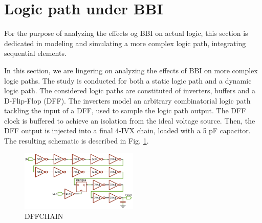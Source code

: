 
\section{Logic path under BBI}
For the purpose of analyzing the effects og BBI on actual logic, this section is dedicated in modeling and simulating a more complex logic path, integrating sequential elements.


In this section, we are lingering on analyzing the effects of BBI on more complex logic paths.
The study is conducted for both a static logic path and a dynamic logic path.
The considered logic paths are constituted of inverters, buffers and a D-Flip-Flop (DFF).
The inverters model an arbitrary combinatorial logic path tackling the input of a DFF, used to sample the logic path output.
The DFF clock is buffered to achieve an isolation from the ideal voltage source.
Then, the DFF output is injected into a final 4-IVX chain, loaded with a 5 pF capacitor.
The resulting schematic is described in Fig. \ref{dffChain}.

\begin{figure}[h]
	\label{dffChain}
	\includegraphics[width=0.5\textwidth]{./figures/dff_ivx_chain_2.pdf}
	\caption{DFFCHAIN}
\end{figure}
